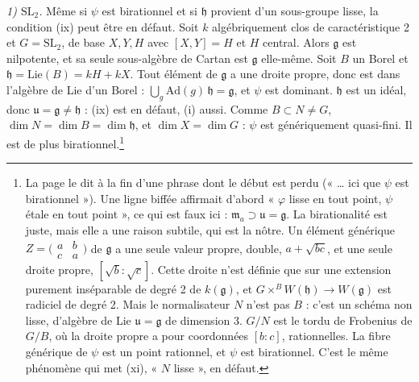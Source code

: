 \documentclass[11pt,a4paper]{article}
\begin{document}
\emph{1) $\mathrm{SL}_{2}$.} Même si $\psi$ est birationnel et si
$\mathfrak{h}$ provient d'un sous-groupe lisse, la condition (ix) peut être
en défaut. Soit $k$ algébriquement clos de caractéristique 2 et
$G = \mathrm{SL}_{2}$, de base $X, Y, H$ avec $[X, Y] = H$ et $H$ central.
Alors $\mathfrak{g}$ est nilpotente, et sa seule sous-algèbre de Cartan est
$\mathfrak{g}$ elle-même. Soit $B$ un Borel et $\mathfrak{h} =
\mathrm{Lie}(B) = kH + kX$. Tout élément de $\mathfrak{g}$ a une droite
propre, donc est dans l'algèbre de Lie d'un Borel :
$\bigcup_{g} \mathrm{Ad}(g)\,\mathfrak{h} = \mathfrak{g}$, et $\psi$ est
dominant. $\mathfrak{h}$ est un idéal, donc $\mathfrak{u} = \mathfrak{g}
\neq \mathfrak{h}$ : (ix) est en défaut, (i) aussi. Comme $B \subset N \neq
G$, $\dim N = \dim B = \dim \mathfrak{h}$, et
$\dim X = \dim G$ : $\psi$ est génériquement quasi-fini. Il est de plus
birationnel.\footnote{La page le dit à la fin d'une phrase dont le début est
perdu (« … ici que $\psi$ est birationnel »). Une ligne biffée affirmait
d'abord « $\varphi$ lisse en tout point, $\psi$ étale en tout point », ce qui
est faux ici : $\mathfrak{m}_{a} \supset \mathfrak{u} = \mathfrak{g}$. La
birationalité est juste, mais elle a une raison subtile, qui est la nôtre.
Un élément générique $Z = \bigl(\begin{smallmatrix} a & b \\ c & a
\end{smallmatrix}\bigr)$ de $\mathfrak{g}$ a une seule valeur propre, double,
$a + \sqrt{bc}$, et une seule droite propre, $[\sqrt{b} : \sqrt{c}]$. Cette
droite n'est définie que sur une extension purement inséparable de degré 2 de
$k(\mathfrak{g})$, et $G \times^{B} W(\mathfrak{h}) \to W(\mathfrak{g})$
est radiciel de degré 2. Mais le normalisateur $N$ n'est pas $B$ : c'est un
schéma non lisse, d'algèbre de Lie $\mathfrak{u} = \mathfrak{g}$ de dimension
3. $G/N$ est le tordu de Frobenius de $G/B$, où la droite propre a pour
coordonnées $[b : c]$, rationnelles. La fibre générique de $\psi$ est un
point rationnel, et $\psi$ est birationnel. C'est le même phénomène qui met
(xi), « $N$ lisse », en défaut.}
\end{document}
